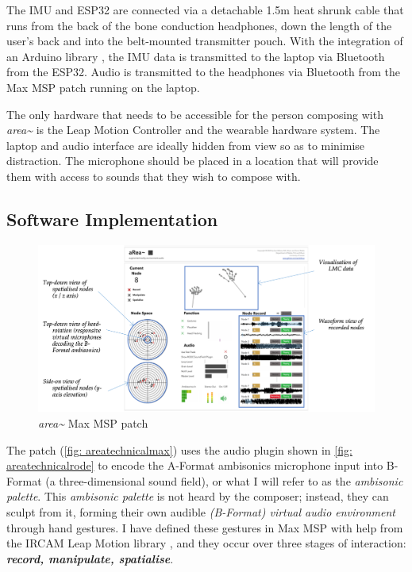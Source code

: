 The IMU and ESP32 are connected via a detachable 1.5m heat shrunk cable that runs from the back of the bone conduction headphones, down the length of the user's back and into the belt-mounted transmitter pouch. With the integration of an Arduino library \citep{winer2016}, the IMU data is transmitted to the laptop via Bluetooth from the ESP32. Audio is transmitted to the headphones via Bluetooth from the Max MSP patch running on the laptop. 

The only hardware that needs to be accessible for the person composing with \textit{area\textasciitilde{}} is the Leap Motion Controller and the wearable hardware system. The laptop and audio interface are ideally hidden from view so as to minimise distraction. The microphone should be placed in a location that will provide them with access to sounds that they wish to compose with.

\subsection{Software Implementation}            \label{sec: area-system-software}

\begin{figure}
    \centering
    \includegraphics[width=\linewidth]{figures/05-area/areatechnical_max.png}
    \caption{\textit{area\textasciitilde{}} Max MSP patch}
    \label{fig: areatechnicalmax}
\end{figure}
The patch (\autoref{fig: areatechnicalmax}) uses the audio plugin \citep{rode2020} shown in \autoref{fig: areatechnicalrode} to encode the A-Format ambisonics microphone input into B-Format (a three-dimensional sound field), or what I will refer to as the \textit{ambisonic palette}. This \textit{ambisonic palette} is not heard by the composer; instead, they can sculpt from it, forming their own audible \textit{(B-Format) virtual audio environment} through hand gestures. I have defined these gestures in Max MSP with help from the IRCAM Leap Motion library \citeyearpar{ircam2014}, and they occur over three stages of interaction: \textit{\textbf{record, manipulate, spatialise}}. 


